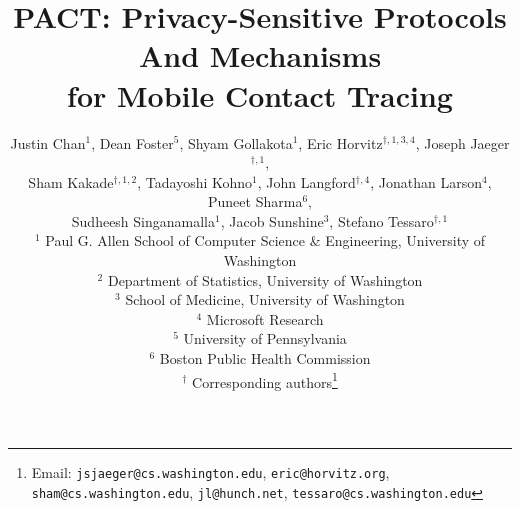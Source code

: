 


\newcommand{\TODO}[1]{ {\color{blue} #1 }}

\let\proposition\undefined
\newtheorem{proposition}{Proposition}



\newcommand{\sk}[1]{\textsf{\color{magenta} SK: #1}}

\title{{\Huge PACT\/}:   {\Huge P\/}rivacy-Sensitive Protocols {\Huge A\/}nd Mechanisms
\\for Mobile {\Huge C\/}ontact {\Huge T\/}racing }
\date{}

\author{
Justin Chan$^{1}$, Dean Foster$^{5}$, Shyam Gollakota$^{1}$, Eric Horvitz$^{\dag,1,3,4}$,  Joseph Jaeger$^{\dag,1}$,\\ 
Sham Kakade$^{\dag,1,2}$, Tadayoshi Kohno$^{1}$, John Langford$^{\dag,4}$, Jonathan Larson$^{4}$, Puneet Sharma$^{6}$,\\   Sudheesh Singanamalla$^{1}$,
Jacob Sunshine$^{3}$, Stefano Tessaro$^{\dag,1}$  
\\
	$^1$ Paul G. Allen School of Computer Science \& Engineering, University of Washington
\\
	$^2$ Department of Statistics, University of Washington
\\
	$^3$ School of Medicine, University of Washington
\\
	$^4$ Microsoft Research
\\
	$^5$ University of Pennsylvania
\\
    $^6$ Boston Public Health Commission
\\
	$^{\dag}$ Corresponding authors\footnote{Email: \texttt{jsjaeger@cs.washington.edu}, \texttt{eric@horvitz.org}, \texttt{sham@cs.washington.edu}, \texttt{jl@hunch.net},
	\texttt{tessaro@cs.washington.edu}
	}
}





\maketitle


